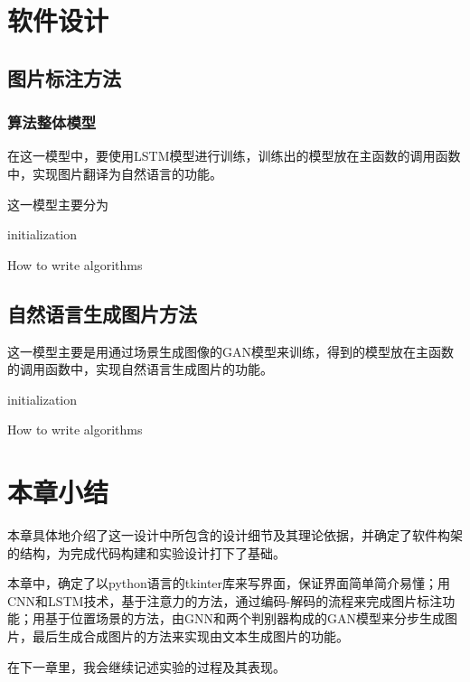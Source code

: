 \section{软件设计}

\subsection{图片标注方法}
\subsubsection{算法整体模型}
在这一模型中，要使用LSTM模型进行训练，训练出的模型放在主函数的调用函数中，实现图片翻译为自然语言的功能。

这一模型主要分为

\begin{algorithm}[H]
    \SetAlgoLined
     initialization\;
    \caption{How to write algorithms}
  \end{algorithm}
\subsection{自然语言生成图片方法}
这一模型主要是用通过场景生成图像的GAN模型来训练，得到的模型放在主函数的调用函数中，实现自然语言生成图片的功能。

\begin{algorithm}[H]
    \SetAlgoLined
     initialization\;
    \caption{How to write algorithms}
  \end{algorithm}
\section{本章小结}
本章具体地介绍了这一设计中所包含的设计细节及其理论依据，并确定了软件构架的结构，为完成代码构建和实验设计打下了基础。

本章中，确定了以python语言的tkinter库来写界面，保证界面简单简介易懂；用CNN和LSTM技术，基于注意力的方法，通过编码-解码的流程来完成图片标注功能；用基于位置场景的方法，由GNN和两个判别器构成的GAN模型来分步生成图片，最后生成合成图片的方法来实现由文本生成图片的功能。

在下一章里，我会继续记述实验的过程及其表现。



